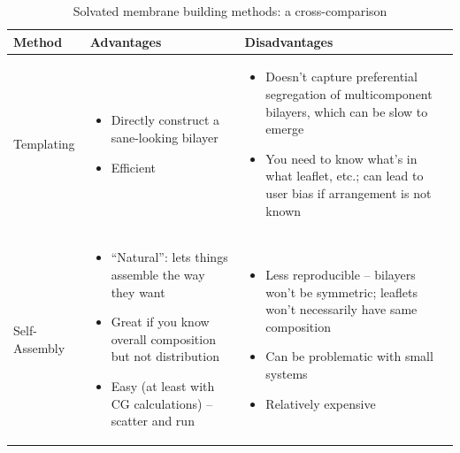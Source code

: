 \documentclass[9pt,bestpractices]{livecoms}
\begin{document}
\begin{table}[t]
\centering
\caption{Solvated membrane building methods: a cross-comparison}
\label{my-label}
\begin{tabularx}{\linewidth}{| l | X | X |}
\hline
\textbf{Method} & \textbf{Advantages} & \textbf{Disadvantages} \\
\hline
Templating & \begin{minipage}[t]{\linewidth} \begin{itemize}[nosep,after=\strut] \item Directly construct a sane-looking bilayer \item Efficient \end{itemize} \end{minipage} & \begin{minipage}[t]{\linewidth} \begin{itemize}[nosep,after=\strut] \item Doesn't capture preferential segregation of multicomponent bilayers, which can be slow to emerge \item You need to know what's in what leaflet, etc.; can lead to user bias if arrangement is not known \end{itemize} \end{minipage} \\
\hline
Self-Assembly & \begin{minipage}[t]{\linewidth} \begin{itemize}[nosep,after=\strut] \item ``Natural'': lets things assemble the way they want \item Great if you know overall composition but not distribution \item Easy (at least with CG calculations) -- scatter and run \end{itemize} \end{minipage} & \begin{minipage}[t]{\linewidth} \begin{itemize}[nosep,after=\strut] \item Less reproducible -- bilayers won't be symmetric; leaflets won't necessarily have same composition \item Can be problematic with small systems \item Relatively expensive \end{itemize} \end{minipage} \\                                                                                            
\hline
\end{tabularx}
\end{table}
\end{document}
